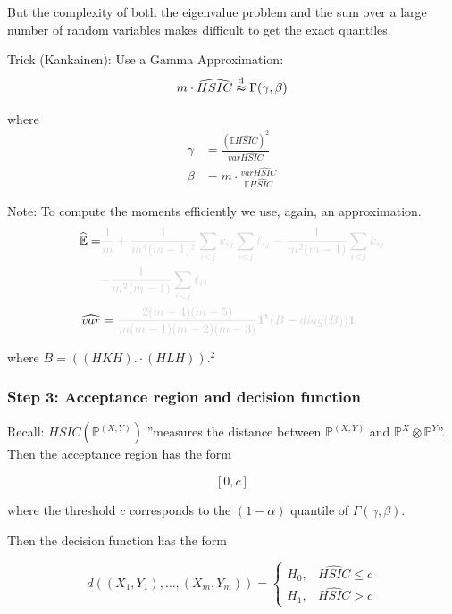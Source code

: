 But the complexity of both the eigenvalue problem and the sum over a large number of random variables makes difficult to get the exact quantiles.
\clearpage

Trick (Kankainen): Use a Gamma Approximation:
\begin{equation*}
m \cdot \widehat{HSIC} \overset{\text{\scriptsize d}}{\thickapprox} \Gamma(\gamma, \beta)
\end{equation*}

where 
\begin{align*}
\gamma &= \frac{(\mathbb{E} \widehat{HSIC})^2}{var \widehat{HSIC}} \\
\beta & = m\cdot \frac{var\widehat{HSIC}}{\mathbb{E}\widehat{HSIC}}
\end{align*}
\clearpage

Note: To compute the moments efficiently we use, again, an approximation.
\begin{align*}
\mathbb{\widehat{E}} = & {\color{ETHlightgray} \frac{1}{m} + \frac{1}{m^4(m-1)^2}\sum_{i<j}k_{ij}\sum_{i<j}\ell_{ij}-\frac{1}{m^2(m-1)}\sum_{i<j}k_{ij}} \\& {\color{ETHlightgray} - \frac{1}{m^2(m-1)}\sum_{i<j}\ell_{ij} }\\
\widehat{var} & = {\color{ETHlightgray}\frac{2(m-4)(m-5)}{m(m-1)(m-2)(m-3)} \mathbf{1^{t}}(B-diag(B))\mathbf{1}}
\end{align*}

where $B=((HKH).\cdot (HLH)).^2$

\clearpage

\subsubsection{Step 3: Acceptance region and decision function}

Recall: $HSIC(\mathbb{P}^{(X,Y)})$ ''measures the distance between $\mathbb{P}^{(X,Y)}$ and $\mathbb{P}^X \otimes \mathbb{P}^Y$''.\\

Then the acceptance region has the form

\begin{equation*}
\left[ 0, c\right]
\end{equation*}

where the threshold $c$ corresponds to the $(1-\alpha)$ quantile of $\Gamma(\gamma,\beta)$.

\clearpage

Then the decision function has the form

\begin{equation*}
d\left((X_1,Y_1), \ldots, (X_m, Y_m)\right)=\left\lbrace\begin{matrix}
H_0, & \widehat{HSIC}\leq c \\
H_1, & \widehat{HSIC} > c
\end{matrix} \right.
\end{equation*}


